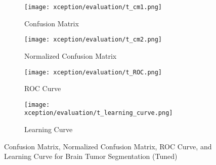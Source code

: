   \begin{figure}[H]
    \centering
    \begin{subfigure}[b]{0.2\textwidth}
      \centering
      \texttt{[image: xception/evaluation/t\_cm1.png]}
      \caption{Confusion Matrix}
      \label{fig:xception_t_cm1}
    \end{subfigure}
    \hfill
    \begin{subfigure}[b]{0.2\textwidth}
      \centering
      \texttt{[image: xception/evaluation/t\_cm2.png]}
      \caption{Normalized Confusion Matrix}
      \label{fig:xception_t_cm2}
    \end{subfigure}
    \hfill
    \begin{subfigure}[b]{0.25\textwidth}
      \centering
      \texttt{[image: xception/evaluation/t\_ROC.png]}
      \caption{ROC Curve}
      \label{fig:xception_t_roc}
    \end{subfigure}
    \hfill
    \begin{subfigure}[b]{0.25\textwidth}
      \centering
      \texttt{[image: xception/evaluation/t\_learning\_curve.png]}
      \caption{Learning Curve}
      \label{fig:xception_t_learning_curve}
    \end{subfigure}
    \caption{Confusion Matrix, Normalized Confusion Matrix, ROC Curve, and Learning Curve for Brain Tumor Segmentation (Tuned)}
    \label{fig:xception_t_evaluation}
  \end{figure}
  
